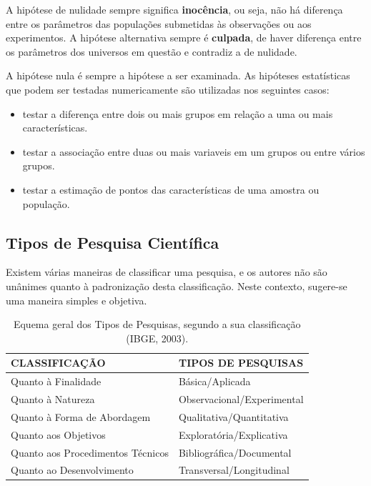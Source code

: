 A hipótese de nulidade sempre significa \textbf{inocência}, ou seja, não há diferença entre os parâmetros das populações submetidas às observações ou aos experimentos. A hipótese alternativa sempre é \textbf{culpada}, de haver diferença entre os parâmetros dos universos em questão e contradiz a de nulidade.\vskip0.3cm



A hipótese nula é sempre a hipótese a ser examinada. As hipóteses estatísticas que podem ser testadas numericamente são utilizadas nos seguintes casos:

\begin{itemize}
\item testar a diferença entre dois ou mais grupos em relação a uma ou mais características.
\item testar a associação entre duas ou mais variaveis em um grupos ou entre vários grupos. 
\item testar a estimação de pontos das características de uma amostra ou população.
\end{itemize}



\subsection{Tipos de Pesquisa Científica}

Existem várias maneiras de classificar uma pesquisa, e os autores não são unânimes quanto à padronização desta classificação. Neste contexto, sugere-se uma maneira simples e objetiva.\vskip0.3cm 

\begin{table}[htp!]
    \centering
    \caption{Equema geral dos Tipos de Pesquisas, segundo a sua classificação (IBGE, 2003).}
    \begin{tabular}{l|l}
    \hline \hline
    CLASSIFICAÇÃO                & TIPOS DE PESQUISAS   \\    
    \hline\hline
     Quanto à Finalidade         & Básica/Aplicada \\
     \hline
     Quanto à Natureza           & Observacional/Experimental  \\
     \hline
    Quanto à Forma de Abordagem  & Qualitativa/Quantitativa \\
    \hline
     Quanto aos Objetivos        & Exploratória/Explicativa \\
     \hline
    Quanto aos Procedimentos Técnicos     & Bibliográfica/Documental             \\
       \hline     
    Quanto ao Desenvolvimento    & Transversal/Longitudinal              \\
  \hline\hline
    \end{tabular}
\end{table}






